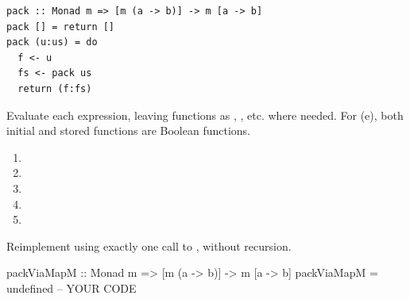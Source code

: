\clearpage
{}
\par\noindent\begin{minipage}{\linewidth}
\begin{lstlisting}
pack :: Monad m => [m (a -> b)] -> m [a -> b]
pack [] = return []
pack (u:us) = do
  f <- u
  fs <- pack us
  return (f:fs)
\end{lstlisting}
\end{minipage}\par
Evaluate each expression, leaving functions as , , etc.
where needed. For (e), both initial and stored functions are Boolean functions.
\begin{enumerate}[label=(\alph*)]
\item {}
\answer{[Answer.]}
\item {}
\answer{[Answer.]}
\item {}
\answer{[Answer.]}
\item {}
\item {}
\end{enumerate}
Reimplement  using exactly one call to , without recursion.
\par\noindent\begin{minipage}{\linewidth}
\begin{codeanswer}
packViaMapM :: Monad m => [m (a -> b)] -> m [a -> b]
packViaMapM = undefined  -- YOUR CODE
\end{codeanswer}
\end{minipage}\par

